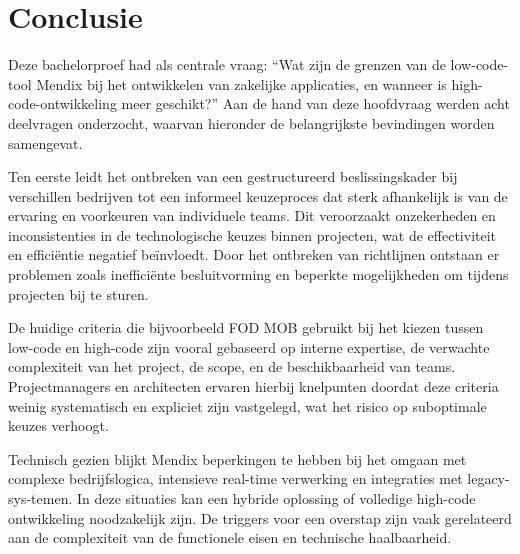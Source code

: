 
\chapter{Conclusie}%
\label{ch:conclusie}


Deze bachelorproef had als centrale vraag: “Wat zijn de grenzen van de low-code-tool Mendix bij het ontwikkelen van zakelijke applicaties, en wanneer is high-code-ontwikkeling meer geschikt?” Aan de hand van deze hoofdvraag werden acht deelvragen onderzocht, waarvan hieronder de belangrijkste bevindingen worden samengevat.

Ten eerste leidt het ontbreken van een gestructureerd beslissingskader bij verschillen bedrijven tot een informeel keuzeproces dat sterk afhankelijk is van de ervaring en voorkeuren van individuele teams. Dit veroorzaakt onzekerheden en inconsistenties in de technologische keuzes binnen projecten, wat de effectiviteit en efficiëntie negatief beïnvloedt. Door het ontbreken van richtlijnen ontstaan er problemen zoals inefficiënte besluitvorming en beperkte mogelijkheden om tijdens projecten bij te sturen.

De huidige criteria die bijvoorbeeld \gls{FOD MOB} gebruikt bij het kiezen tussen low-code en high-code zijn vooral gebaseerd op interne expertise, de verwachte complexiteit van het project, de scope, en de beschikbaarheid van teams. Projectmanagers en architecten ervaren hierbij knelpunten doordat deze criteria weinig systematisch en expliciet zijn vastgelegd, wat het risico op suboptimale keuzes verhoogt.

Technisch gezien blijkt Mendix beperkingen te hebben bij het omgaan met complexe bedrijfslogica, intensieve real-time verwerking en integraties met legacy-sys-temen. In deze situaties kan een hybride oplossing of volledige high-code ontwikkeling noodzakelijk zijn. De triggers voor een overstap zijn vaak gerelateerd aan de complexiteit van de functionele eisen en technische haalbaarheid.

